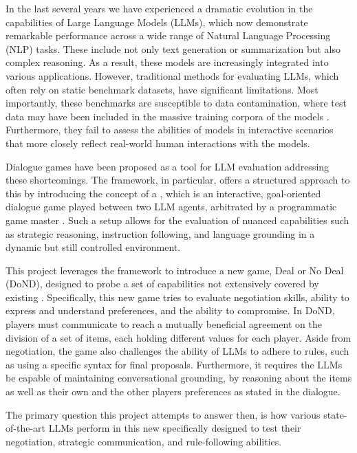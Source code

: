 In the last several years we have experienced a dramatic evolution in the capabilities of Large Language Models (LLMs), which now demonstrate remarkable performance across a wide range of Natural Language Processing (NLP) tasks. These include not only text generation or summarization but also complex reasoning. As a result, these models are increasingly integrated into various applications. However, traditional methods for evaluating LLMs, which often rely on static benchmark datasets, have significant limitations. Most importantly, these benchmarks are susceptible to data contamination, where test data may have been included in the massive training corpora of the models \cite{magar-schwartz-2022-data}. Furthermore, they fail to assess the abilities of models in interactive scenarios that more closely reflect real-world human interactions with the models.

Dialogue games have been proposed as a tool for LLM evaluation addressing these shortcomings. The  framework, in particular, offers a structured approach to this by introducing the concept of a , which is an interactive, goal-oriented dialogue game played between two LLM agents, arbitrated by a programmatic game master \cite{chalamalasetti-etal-2023-clembench}. Such a setup allows for the evaluation of nuanced capabilities such as strategic reasoning, instruction following, and language grounding in a dynamic but still controlled environment.

This project leverages the  framework to introduce a new game, Deal or No Deal (DoND), designed to probe a set of capabilities not extensively covered by existing . Specifically, this new game tries to evaluate negotiation skills, ability to express and understand preferences, and the ability to compromise. In DoND, players must communicate to reach a mutually beneficial agreement on the division of a set of items, each holding different values for each player. Aside from negotiation, the game also challenges the ability of LLMs to adhere to rules, such as using a specific syntax for final proposals. Furthermore, it requires the LLMs be capable of maintaining conversational grounding, by reasoning about the items as well as their own and the other players preferences as stated in the dialogue.

The primary question this project attempts to answer then, is how various state-of-the-art LLMs perform in this new  specifically designed to test their negotiation, strategic communication, and rule-following abilities.

